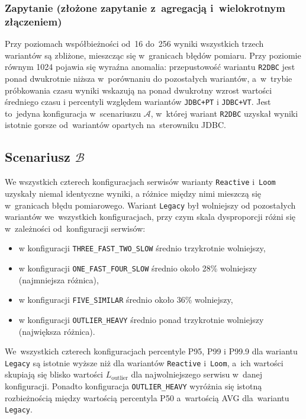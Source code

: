 \subsubsection{Zapytanie  (złożone zapytanie z~agregacją i~wielokrotnym złączeniem)}

Przy poziomach współbieżności od~16 do~256 wyniki wszystkich trzech wariantów są zbliżone, mieszcząc się w~granicach błędów pomiaru. Przy poziomie równym 1024 pojawia się wyraźna anomalia: przepustowość wariantu \texttt{R2DBC} jest ponad dwukrotnie niższa w~porównaniu do pozostałych wariantów, a~w~trybie próbkowania czasu wyniki wskazują na ponad dwukrotny wzrost wartości średniego czasu i percentyli względem wariantów \texttt{JDBC+PT} i \texttt{JDBC+VT}. Jest to~jedyna konfiguracja w~scenariuszu $\mathcal{A}$, w~której wariant \texttt{R2DBC} uzyskał wyniki istotnie gorsze od~wariantów opartych na~sterowniku JDBC.

\newpage
\subsection{Scenariusz \ensuremath{\mathcal{B}}}

We wszystkich czterech konfiguracjach serwisów warianty \texttt{Reactive} i~\texttt{Loom} uzyskały niemal identyczne wyniki, a różnice między nimi mieszczą się w~granicach błędu pomiarowego. Wariant \texttt{Legacy} był wolniejszy od pozostałych wariantów we~wszystkich konfiguracjach, przy czym skala dysproporcji różni się w~zależności od~konfiguracji serwisów:
\begin{itemize}
    \itemsep0em
    \item w konfiguracji \texttt{THREE\_FAST\_TWO\_SLOW} średnio trzykrotnie wolniejszy,
    \item w konfiguracji \texttt{ONE\_FAST\_FOUR\_SLOW} średnio około 28\% wolniejszy (najmniejsza różnica),
    \item w konfiguracji \texttt{FIVE\_SIMILAR} średnio około 36\% wolniejszy,
    \item w konfiguracji \texttt{OUTLIER\_HEAVY} średnio ponad trzykrotnie wolniejszy (największa różnica).
\end{itemize}

We~wszystkich czterech konfiguracjach percentyle P95, P99 i P99.9 dla wariantu \texttt{Legacy} są istotnie wyższe niż dla wariantów \texttt{Reactive} i~\texttt{Loom}, a~ich wartości skupiają się blisko wartości $L_{\text{outlier}}$ dla najwolniejszego serwisu w~danej konfiguracji. Ponadto konfiguracja \texttt{OUTLIER\_HEAVY} wyróżnia się istotną rozbieżnością między wartością percentyla P50 a~wartością AVG dla~wariantu \texttt{Legacy}.